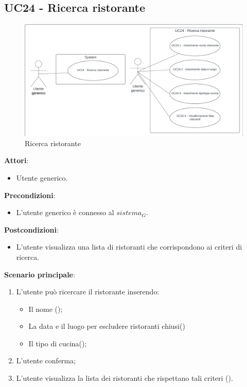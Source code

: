 \subsection{UC24 - Ricerca ristorante}\label{usecase:24}

\begin{figure}[H]
    \centering
    \includegraphics[width=0.9\linewidth]{ucd/UCD24.png}
    \caption{Ricerca ristorante}
\end{figure}

\textbf{Attori}:
\begin{itemize}
    \item Utente generico.
\end{itemize}
\textbf{Precondizioni}:
\begin{itemize}
    \item L'utente generico è connesso al $\textit{sistema}_G$.
\end{itemize}
\textbf{Postcondizioni}:
\begin{itemize}
    \item L'utente visualizza una lista di ristoranti che corrispondono ai criteri di ricerca.
\end{itemize}
\textbf{Scenario principale}:
\begin{enumerate}
    \item L'utente può ricercare il ristorante inserendo:
    \begin{itemize}
        \item Il nome ();
        \item La data e il luogo per escludere ristoranti chiusi()
        \item Il tipo di cucina();
    \end{itemize}
    \item L'utente conferma;
    \item L'utente visualizza la lista dei ristoranti che rispettano tali criteri ().
\end{enumerate}

